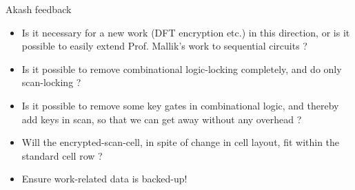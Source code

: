 \begin{frame}{Akash feedback}
\begin{itemize}
\item Is it necessary for a new work (DFT encryption etc.) in this direction, or is it possible to easily extend Prof. Mallik's work to sequential circuits ?
\item Is it possible to remove combinational logic-locking completely, and do only scan-locking ?
\item Is it possible to remove some key gates in combinational logic, and thereby add keys in scan, so that we can get away without any overhead ?
\item Will the encrypted-scan-cell, in spite of change in cell layout, fit within the standard cell row ?
\item Ensure work-related data is backed-up!
\end{itemize}
\end{frame}
